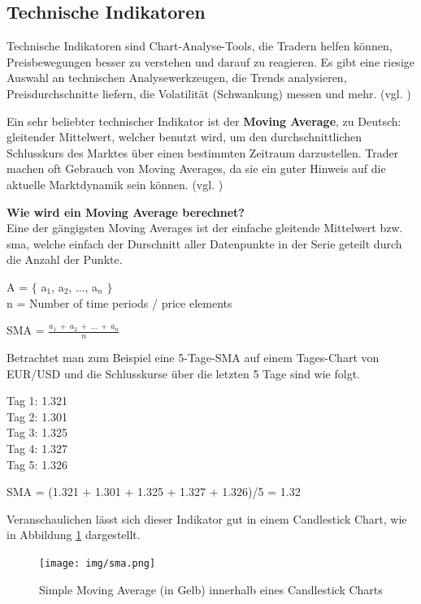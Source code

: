 \documentclass[oneside]{ausarbeitung}
\begin{document}
\subsection{Technische Indikatoren}
\label{sub:technische_Indikatoren}

Technische Indikatoren sind Chart-Analyse-Tools, die Tradern helfen
können, Preisbewegungen besser zu verstehen und darauf zu reagieren.
Es gibt eine riesige Auswahl an technischen Analysewerkzeugen, die
Trends analysieren, Preisdurchschnitte liefern, die Volatilität
(Schwankung) messen und mehr. (vgl. \cite{technical_indicators})

Ein sehr beliebter technischer Indikator ist der \textbf{Moving
Average}, zu Deutsch: gleitender Mittelwert, welcher benutzt wird, um
den durchschnittlichen Schlusskurs des Marktes über einen bestimmten
Zeitraum darzustellen. Trader machen oft Gebrauch von Moving Averages,
da sie ein guter Hinweis auf die aktuelle Marktdynamik sein können.
(vgl. \cite{moving_average})

\textbf{Wie wird ein Moving Average berechnet?} \\
Eine der gängigsten Moving Averages ist der einfache gleitende
Mittelwert bzw. \ac{sma}, welche einfach der Durschnitt aller
Datenpunkte in der Serie geteilt durch die Anzahl der
Punkte\cite{moving_average}.

A = $ \{ $ {a$_{1}$, a$_{2}$, ..., a$_{n}$} $ \} $ \\
n = Number of time periods / price elements

SMA = $\frac{a_1 \ + \ a_2 \ + \ ... \ + \ a_n}{n}$

Betrachtet man zum Beispiel eine 5-Tage-SMA auf einem Tages-Chart von
EUR/USD und die Schlusskurse über die letzten 5 Tage sind wie folgt.

Tag 1: 1.321 \\
Tag 2: 1.301 \\
Tag 3: 1.325 \\
Tag 4: 1.327 \\
Tag 5: 1.326

SMA = (1.321 + 1.301 + 1.325 + 1.327 + 1.326)/5 = 1.32

Veranschaulichen lässt sich dieser Indikator gut in einem Candlestick
Chart, wie in Abbildung \ref{fig:3} dargestellt.

\begin{figure}[H]
  \centering
  \texttt{[image: img/sma.png]}
  \caption{Simple Moving Average (in Gelb) innerhalb eines Candlestick Charts}
  \label{fig:3}
\end{figure} 
\end{document}
